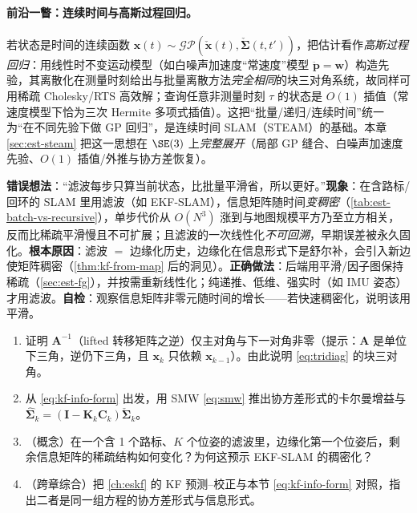 \paragraph{前沿一瞥：连续时间与高斯过程回归。}
若状态是时间的连续函数 $\mathbf{x}(t)\sim\mathcal{GP}(\check{\mathbf{x}}(t),\check{\boldsymbol{\Sigma}}(t,t'))$，把估计看作\emph{高斯过程回归}：用线性时不变运动模型（如白噪声加速度“常速度”模型 $\ddot{\mathbf{p}}=\mathbf{w}$）构造先验，其离散化在测量时刻给出与批量离散方法\emph{完全相同}的块三对角系统，故同样可用稀疏 Cholesky/RTS 高效解；查询任意非测量时刻 $\tau$ 的状态是 $O(1)$ 插值（常速度模型下恰为三次 Hermite 多项式插值）\cite{barfoot2024state}。这把“批量/递归/连续时间”统一为“在不同先验下做 GP 回归”，是连续时间 SLAM（STEAM）的基础。本章 \cref{sec:est-steam} 把这一思想在 $\SE(3)$ 上\emph{完整展开}（局部 GP 缝合、白噪声加速度先验、$O(1)$ 插值/外推与协方差恢复）。

\begin{pitfall}
\textbf{错误想法}：“滤波每步只算当前状态，比批量平滑省，所以更好。”\textbf{现象}：在含路标/回环的 SLAM 里用滤波（如 EKF-SLAM），信息矩阵随时间\emph{变稠密}（\cref{tab:est-batch-vs-recursive}），单步代价从 $O(N^3)$ 涨到与地图规模平方乃至立方相关，反而比稀疏平滑慢且不可扩展；且滤波的一次线性化\emph{不可回溯}，早期误差被永久固化。\textbf{根本原因}：滤波 $=$ 边缘化历史，边缘化在信息形式下是舒尔补，会引入新边使矩阵稠密（\cref{thm:kf-from-map} 后的洞见）。\textbf{正确做法}：后端用平滑/因子图保持稀疏（\cref{sec:est-fg}），并按需重新线性化；纯递推、低维、强实时（如 IMU 姿态）才用滤波。\textbf{自检}：观察信息矩阵非零元随时间的增长——若快速稠密化，说明该用平滑。
\end{pitfall}

\begin{practice}
\begin{enumerate}
  \item 证明 $\mathbf{A}^{-1}$（lifted 转移矩阵之逆）仅主对角与下一对角非零（提示：$\mathbf{A}$ 是单位下三角，逆仍下三角，且 $\mathbf{x}_k$ 只依赖 $\mathbf{x}_{k-1}$）。由此说明 \cref{eq:tridiag} 的块三对角。
  \item 从 \cref{eq:kf-info-form} 出发，用 SMW \cref{eq:smw} 推出协方差形式的卡尔曼增益与 $\hat{\boldsymbol{\Sigma}}_k=(\mathbf{I}-\mathbf{K}_k\mathbf{C}_k)\check{\boldsymbol{\Sigma}}_k$。
  \item （概念）在一个含 1 个路标、$K$ 个位姿的滤波里，边缘化第一个位姿后，剩余信息矩阵的稀疏结构如何变化？为何这预示 EKF-SLAM 的稠密化？
  \item （跨章综合）把 \cref{ch:eskf} 的 KF 预测–校正与本节 \cref{eq:kf-info-form} 对照，指出二者是同一组方程的协方差形式与信息形式。
\end{enumerate}
\end{practice}

